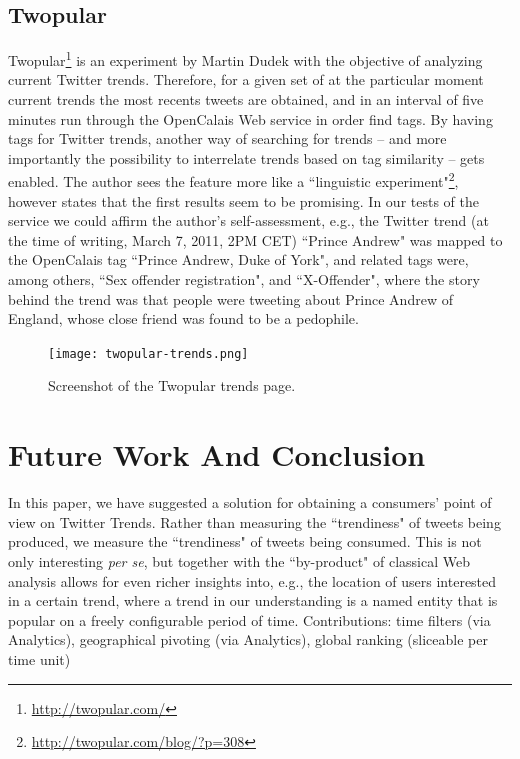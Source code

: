 \documentclass[runningheads,a4paper]{llncs}
\begin{document}
\subsection{Twopular}\label{sec:twopular}
Twopular\footnote{\url{http://twopular.com/}} is an experiment by Martin Dudek with the objective of analyzing current Twitter trends. Therefore, for a given set of at the particular moment current trends the most recents tweets are obtained, and in an interval of five minutes run through the OpenCalais Web service in order find tags. By having tags for Twitter trends, another way of searching for trends -- and more importantly the possibility to interrelate trends based on tag similarity -- gets enabled. The author sees the feature more like a ``linguistic experiment"\footnote{\url{http://twopular.com/blog/?p=308}}, however states that the first results seem to be promising. In our tests of the service we could affirm the author's self-assessment, e.g., the Twitter trend (at the time of writing, March 7, 2011, 2PM CET) ``Prince Andrew" was mapped to the OpenCalais tag ``Prince Andrew, Duke of York", and related tags were, among others,  ``Sex offender registration", and ``X-Offender", where the story behind the trend was that people were tweeting about Prince Andrew of England, whose close friend was found to be a pedophile.

\begin{figure}[h!]
  \centering
  \texttt{[image: twopular-trends.png]}
  \caption{Screenshot of the Twopular trends page.}
  \label{fig:twopular}
\end{figure}

\section{Future Work And Conclusion}\label{sec:conclusion}
In this paper, we have suggested a solution for obtaining a consumers' point of view on Twitter Trends. Rather than measuring the ``trendiness" of tweets being produced, we measure the ``trendiness" of tweets being consumed. This is not only interesting \textit{per se}, but together with the ``by-product" of classical Web analysis allows for even richer insights into, e.g., the location of users interested in a certain trend, where a trend in our understanding is a named entity that is popular on a freely configurable period of time.
Contributions: time filters (via Analytics), geographical pivoting (via Analytics), global ranking (sliceable per time unit)




\end{document}
